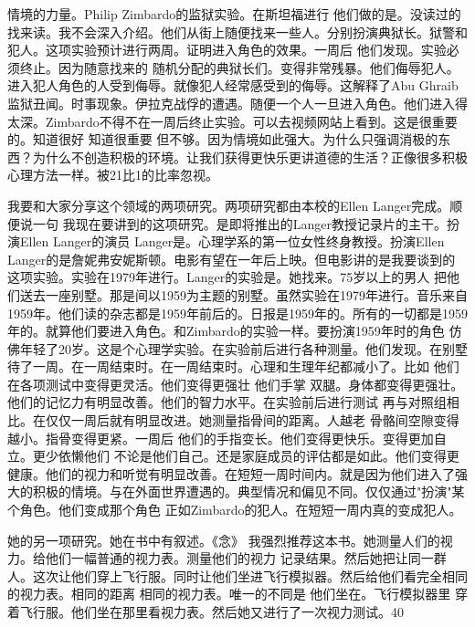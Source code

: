 情境的力量。Philip Zimbardo的监狱实验。在斯坦福进行 他们做的是。没读过的找来读。我不会深入介绍。他们从街上随便找来一些人。分别扮演典狱长。狱警和犯人。这项实验预计进行两周。证明进入角色的效果。一周后 他们发现。实验必须终止。因为随意找来的 随机分配的典狱长们。变得非常残暴。他们侮辱犯人。进入犯人角色的人受到侮辱。就像犯人经常感受到的侮辱。这解释了Abu Ghraib监狱丑闻。时事现象。伊拉克战俘的遭遇。随便一个人一旦进入角色。他们进入得太深。Zimbardo不得不在一周后终止实验。可以去视频网站上看到。这是很重要的。知道很好 知道很重要 但不够。因为情境如此强大。为什么只强调消极的东西？为什么不创造积极的环境。让我们获得更快乐更讲道德的生活？正像很多积极心理方法一样。被21比1的比率忽视。 

我要和大家分享这个领域的两项研究。两项研究都由本校的Ellen Langer完成。顺便说一句 我现在要讲到的这项研究。是即将推出的Langer教授记录片的主干。扮演Ellen Langer的演员 Langer是。心理学系的第一位女性终身教授。扮演Ellen Langer的是詹妮弗安妮斯顿。电影有望在一年后上映。但电影讲的是我要谈到的这项实验。实验在1979年进行。Langer的实验是。她找来。75岁以上的男人 把他们送去一座别墅。那是间以1959为主题的别墅。虽然实验在1979年进行。音乐来自1959年。他们读的杂志都是1959年前后的。日报是1959年的。所有的一切都是1959年的。就算他们要进入角色。和Zimbardo的实验一样。要扮演1959年时的角色 仿佛年轻了20岁。这是个心理学实验。在实验前后进行各种测量。他们发现。在别墅待了一周。在一周结束时。在一周结束时。心理和生理年纪都减小了。比如 他们在各项测试中变得更灵活。他们变得更强壮 他们手掌 双腿。身体都变得更强壮。他们的记忆力有明显改善。他们的智力水平。在实验前后进行测试 再与对照组相比。在仅仅一周后就有明显改进。她测量指骨间的距离。人越老 骨骼间空隙变得越小。指骨变得更紧。一周后 他们的手指变长。他们变得更快乐。变得更加自立。更少依懒他们 不论是他们自己。还是家庭成员的评估都是如此。他们变得更健康。他们的视力和听觉有明显改善。在短短一周时间内。就是因为他们进入了强大的积极的情境。与在外面世界遭遇的。典型情况和偏见不同。仅仅通过"扮演"某个角色。他们变成那个角色 正如Zimbardo的犯人。在短短一周内真的变成犯人。 

她的另一项研究。她在书中有叙述。《念》 我强烈推荐这本书。她测量人们的视力。给他们一幅普通的视力表。测量他们的视力 记录结果。然后她把让同一群人。这次让他们穿上飞行服。同时让他们坐进飞行模拟器。然后给他们看完全相同的视力表。相同的距离 相同的视力表。唯一的不同是 他们坐在。飞行模拟器里 穿着飞行服。他们坐在那里看视力表。然后她又进行了一次视力测试。40%

